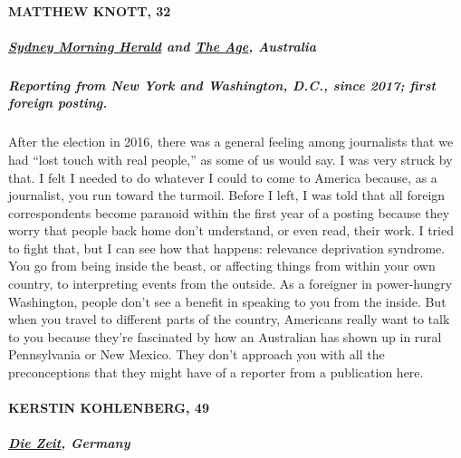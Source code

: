\hypertarget{matthew-knott-32}{%
\paragraph{MATTHEW KNOTT, 32}\label{matthew-knott-32}}

\hypertarget{sydney-morning-herald-and-the-age-australia}{%
\subparagraph{\texorpdfstring{\textbf{\href{https://www.smh.com.au/}{Sydney
Morning Herald}} \textbf{and}
\textbf{\href{https://www.theage.com.au/}{The Age},
Australia}}{Sydney Morning Herald and The Age, Australia}}\label{sydney-morning-herald-and-the-age-australia}}

\hypertarget{reporting-from-new-york-and-washington-dc-since-2017-first-foreign-posting}{%
\subparagraph{\texorpdfstring{\textbf{Reporting from New York and
Washington, D.C., since 2017; first foreign
posting.}}{Reporting from New York and Washington, D.C., since 2017; first foreign posting.}}\label{reporting-from-new-york-and-washington-dc-since-2017-first-foreign-posting}}

After the election in 2016, there was a general feeling among
journalists that we had ``lost touch with real people,'' as some of us
would say. I was very struck by that. I felt I needed to do whatever I
could to come to America because, as a journalist, you run toward the
turmoil. Before I left, I was told that all foreign correspondents
become paranoid within the first year of a posting because they worry
that people back home don't understand, or even read, their work. I
tried to fight that, but I can see how that happens: relevance
deprivation syndrome. You go from being inside the beast, or affecting
things from within your own country, to interpreting events from the
outside. As a foreigner in power-hungry Washington, people don't see a
benefit in speaking to you from the inside. But when you travel to
different parts of the country, Americans really want to talk to you
because they're fascinated by how an Australian has shown up in rural
Pennsylvania or New Mexico. They don't approach you with all the
preconceptions that they might have of a reporter from a publication
here.

\hypertarget{kerstin-kohlenberg-49}{%
\paragraph{KERSTIN KOHLENBERG, 49}\label{kerstin-kohlenberg-49}}

\hypertarget{die-zeit-germany}{%
\subparagraph{\texorpdfstring{\textbf{\href{https://www.zeit.de/index}{Die
Zeit}, Germany}}{Die Zeit, Germany}}\label{die-zeit-germany}}

